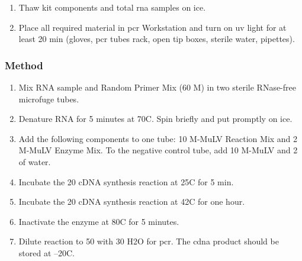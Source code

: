 
\begin{enumerate}
\item Thaw kit components and total \gls{rna} samples on ice.
\item Place all required material in \gls{pcr} Workstation and turn on \gls{uv} light for at least 20 min (gloves, \gls{pcr} tubes rack, open tip boxes, sterile water, pipettes).
\end{enumerate}

\subsubsection{Method}

\begin{enumerate}
\item Mix RNA sample and Random Primer Mix (60 \textmu M) in two sterile RNase-free microfuge tubes.
\item Denature RNA for 5 minutes at 70\degree C. Spin briefly and put promptly on ice. 
\item Add the following components to one tube: 10 \uL M-MuLV Reaction Mix and 2 \uL M-MuLV Enzyme Mix. To the negative control tube, add 10 \uL M-MuLV and 2 \uL of water.
\item  Incubate the 20 \uL cDNA synthesis reaction at 25\degree C for 5 min.
\item Incubate the 20 \uL cDNA synthesis reaction at 42\degree C for one hour.
\item Inactivate the enzyme at 80\degree C for 5 minutes. 
\item Dilute reaction to 50 \uL with 30 \uL H2O for \gls{pcr}. The \gls{cdna} product should be stored at –20\degree C. 
\end{enumerate}


